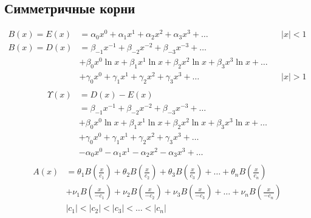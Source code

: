 
\subsection{Симметричные корни}

\begin{equation*} \begin{aligned}
B(x) = E(x) &=
  \alpha_0 x^0
+ \alpha_1 x^1
+ \alpha_2 x^2
+ \alpha_3 x^3
+ \ldots &
&|x| < 1 \\
%
B(x) = D(x) &=   
  \beta_{-1} x^{-1}
+ \beta_{-2} x^{-2}
+ \beta_{-3} x^{-3}
+ \ldots \\ &
+ \beta_0 x^0 \ln{x}
+ \beta_1 x^1 \ln{x}
+ \beta_2 x^2 \ln{x}
+ \beta_3 x^3 \ln{x}
+ \ldots \\ &
+ \gamma_0 x^0
+ \gamma_1 x^1
+ \gamma_2 x^2
+ \gamma_3 x^3
+ \ldots &
&|x| > 1 \\
\end{aligned} \end{equation*}
%
\begin{equation*} \begin{aligned}
\Upsilon(x) &= D(x) - E(x) \\ &=
  \beta_{-1} x^{-1}
+ \beta_{-2} x^{-2}
+ \beta_{-3} x^{-3}
+ \ldots \\ &
+ \beta_0 x^0 \ln{x}
+ \beta_1 x^1 \ln{x}
+ \beta_2 x^2 \ln{x}
+ \beta_3 x^3 \ln{x}
+ \ldots \\ &
+ \gamma_0 x^0
+ \gamma_1 x^1
+ \gamma_2 x^2
+ \gamma_3 x^3
+ \ldots \\ &
- \alpha_0 x^0
- \alpha_1 x^1
- \alpha_2 x^2
- \alpha_3 x^3
+ \ldots \\
\end{aligned} \end{equation*}
%
\begin{equation*} \begin{aligned}
A(x) &=
  \theta_1 B{\left(\frac{x}{c_1} \right)}
+ \theta_2 B{\left(\frac{x}{c_2} \right)}
+ \theta_3 B{\left(\frac{x}{c_3} \right)}
+ \ldots
+ \theta_n B{\left(\frac{x}{c_n} \right)} \\ &
+ \nu_1 B{\left(\frac{x}{- c_1} \right)}
+ \nu_2 B{\left(\frac{x}{- c_2} \right)}
+ \nu_3 B{\left(\frac{x}{- c_3} \right)}
+ \ldots
+ \nu_n B{\left(\frac{x}{- c_n} \right)} \\
%
&|c_1| < |c_2| < |c_3| < \ldots < |c_n|
\end{aligned} \end{equation*}


